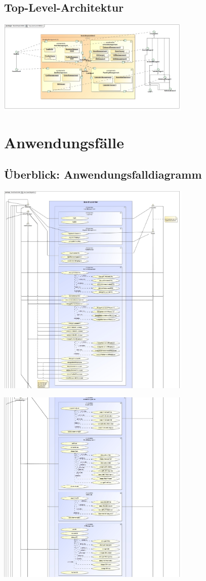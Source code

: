 \documentclass[a4paper]{article}
\begin{document}
\subsection{Top-Level-Architektur}

\includegraphics[width=350px]{top-level-architektur.jpg}

\section{Anwendungsfälle}

\subsection{Überblick: Anwendungsfalldiagramm}

\includegraphics[width=350px]{use-case-diagramm-part1.jpg}

\includegraphics[width=350px]{use-case-diagramm-part2.jpg}
\end{document}
